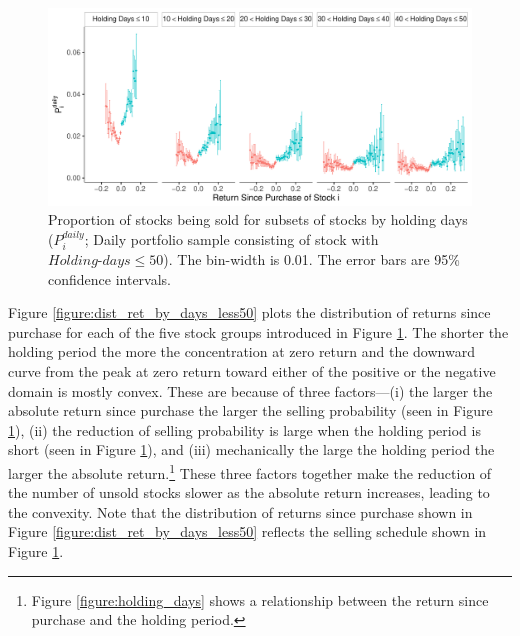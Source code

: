 \documentclass[11pt, a4paper]{article}
\begin{document}
\begin{figure}[H]
	\centering
	\includegraphics[width=1\columnwidth]{barc_schedule_daily_by_days_less50_3.pdf}
	\caption{\small Proportion of stocks being sold for subsets of stocks by holding days ($P^{daily}_{i}$; Daily portfolio sample consisting of stock with $Holding\mbox{-}days\leq50$). The bin-width is 0.01. The error bars are 95\% confidence intervals.}
	\label{figure:prop_by_days_less50}
\end{figure}

Figure \ref{figure:dist_ret_by_days_less50} plots the distribution of returns since purchase for each of the five stock groups introduced in Figure \ref{figure:prop_by_days_less50}. The shorter the holding period the more the concentration at zero return and the downward curve from the peak at zero return toward either of the positive or the negative domain is mostly convex. These are because of three factors---(i) the larger the absolute return since purchase the larger the selling probability (seen in Figure \ref{figure:prop_by_days_less50}), (ii) the reduction of selling probability is large when the holding period is short (seen in Figure \ref{figure:prop_by_days_less50}), and (iii) mechanically the large the holding period the larger the absolute return.\footnote{Figure \ref{figure:holding_days} shows a relationship between the return since purchase and the holding period.} These three factors together make the reduction of the number of unsold stocks slower as the absolute return increases, leading to the convexity. Note that the distribution of returns since purchase shown in Figure \ref{figure:dist_ret_by_days_less50} reflects the selling schedule shown in Figure \ref{figure:prop_by_days_less50}. 
\end{document}
